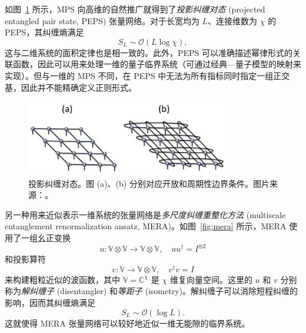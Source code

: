 如图~\ref{fig:peps} 所示，MPS 向高维的自然推广就得到了\emph{投影纠缠对态} (projected entangled pair state, PEPS)\cite{verstraete2004renormalization,orus2014practical,cirac2021matrix} 张量网络。对于长宽均为 $L$、连接维数为 $\chi$ 的 PEPS，其纠缠熵满足
\begin{equation}
  S_L \sim \mathcal{O}(L\log\chi),
\end{equation}
这与二维系统的面积定律也是相一致的。此外，PEPS 可以准确描述幂律形式的关联函数，因此可以用来处理一维的量子临界系统（可通过经典—量子模型的映射来实现）。但与一维的 MPS 不同，在 PEPS 中无法为所有指标同时指定一组正交基，因此并不能精确定义正则形式。

\begin{figure}[htb]
  \centering
  \includegraphics[width=0.8\textwidth]{images/tensor-network/peps.pdf}
  \caption[投影纠缠对态]{投影纠缠对态。图 (a)、(b) 分别对应开放和周期性边界条件。图片来源：\parencite{orus2014practical}。}
  \label{fig:peps}
\end{figure}

另一种用来近似表示一维系统的张量网络是\emph{多尺度纠缠重整化方法} (multiscale entanglement renormalization ansatz, MERA)\cite{vidal2007entanglement,evenbly2009algorithms,konig2009exact,evenbly2014algorithms,evenbly2015tensor2}。如图~\ref{fig:mera} 所示，MERA 使用了一组幺正变换
\begin{equation}
  u \colon \mathbb{V} \otimes \mathbb{V} \to \mathbb{V} \otimes \mathbb{V}, \quad
  u u^\dagger = I^{\otimes2}
\end{equation}
和投影算符
\begin{equation}
  v \colon \mathbb{V} \to \mathbb{V} \otimes \mathbb{V}, \quad
  v^\dagger v = I
\end{equation}
来构建粗粒近似的波函数，其中 $\mathbb{V}=\mathbb{C}^\chi$ 是 $\chi$ 维复向量空间。这里的 $u$ 和 $v$ 分别称为\emph{解纠缠子} (disentangler) 和\emph{等距子} (isometry)。解纠缠子可以消除短程纠缠的影响，因而其纠缠熵满足
\begin{equation}
  S_L \sim \mathcal{O}(\log L).
\end{equation}
这就使得 MERA 张量网络可以较好地近似一维无能隙的临界系统。

